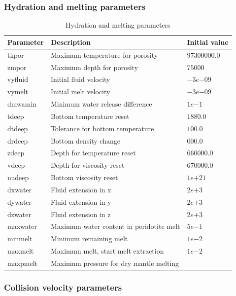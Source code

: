 \begin{table}[H]
\subsubsection{Hydration and melting parameters}

\begin{table}[H]
\small
\centering
\begin{tabular}{l p{7cm} l}
\toprule
Parameter & Description & Initial value \\
\midrule
tkpor 		& Maximum temperature for porosity & $97300000.0$\\
zmpor 		& Maximum depth for porosity & $75000$\\
vyfluid 	& Initial fluid velocity & $-3e{-09}$\\
vymelt 		& Initial melt velocity & $-3e{-09}$\\
dmwamin 	& Minimum water release difference & $1e{-1}$\\
tdeep 		& Bottom temperature reset & $1880.0$\\
dtdeep 		& Tolerance for bottom temperature & $100.0$\\
drdeep 		& Bottom density change & $000.0$\\
zdeep 		& Depth for temperature reset & $660000.0$\\
vdeep		& Depth for viscosity reset & $670000.0$\\
nudeep		& Bottom viscosity reset & $1e{+21}$\\
dxwater		& Fluid extension in x & $2e{+3}$\\
dywater		& Fluid extension in y & $2e{+3}$\\
dzwater		& Fluid extension in z & $2e{+3}$\\
maxwater	& Maximum water content in peridotite melt & $5e{-1}$\\
minmelt		& Minimum remaining melt & $1e{-2}$\\
maxmelt		& Maximum melt, start melt extraction & $1e{-2}$\\
maxpmelt	& Maximum pressure for dry mantle melting & \\
\bottomrule
\end{tabular}
\caption{Hydration and melting parameters}
\label{tbl:mode_melting_parameters}
\end{table}

\subsubsection{Collision velocity parameters}


\end{table}
